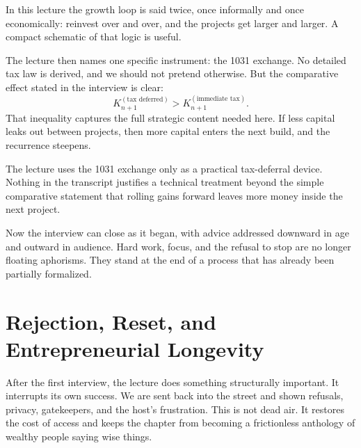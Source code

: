 In this lecture the growth loop is said twice, once informally and once economically: reinvest over and over, and the projects get larger and larger. A compact schematic of that logic is useful.

\begin{figure}
\centering
{}
\end{figure}

The lecture then names one specific instrument: the 1031 exchange. No detailed tax law is derived, and we should not pretend otherwise. But the comparative effect stated in the interview is clear:
\begin{equation}
K_{n+1}^{(\text{tax deferred})} > K_{n+1}^{(\text{immediate tax})}.
\end{equation}
That inequality captures the full strategic content needed here. If less capital leaks out between projects, then more capital enters the next build, and the recurrence steepens.

\begin{remark}
The lecture uses the 1031 exchange only as a practical tax-deferral device. Nothing in the transcript justifies a technical treatment beyond the simple comparative statement that rolling gains forward leaves more money inside the next project.
\end{remark}

Now the interview can close as it began, with advice addressed downward in age and outward in audience. Hard work, focus, and the refusal to stop are no longer floating aphorisms. They stand at the end of a process that has already been partially formalized.

\section{Rejection, Reset, and Entrepreneurial Longevity}

After the first interview, the lecture does something structurally important. It interrupts its own success. We are sent back into the street and shown refusals, privacy, gatekeepers, and the host's frustration. This is not dead air. It restores the cost of access and keeps the chapter from becoming a frictionless anthology of wealthy people saying wise things.

